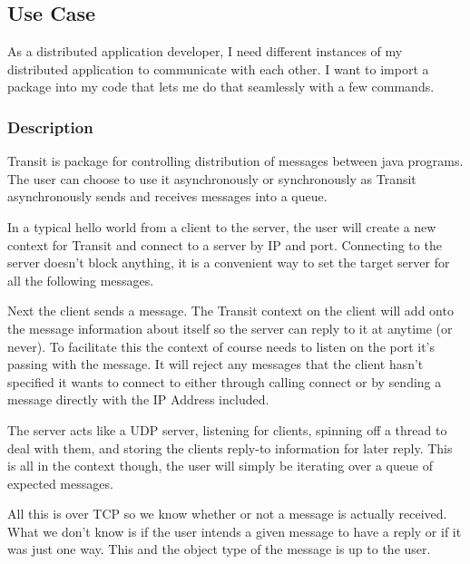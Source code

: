 \documentclass[10pt,journal,compsoc]{IEEEtran}
\begin{document}

 

\subsection{Use Case}
As a distributed application developer, I need different instances of my distributed application to communicate with each other. I want to import a package into my code that lets me do that seamlessly with a few commands.


\subsubsection{Description}
Transit is package for controlling distribution of messages between java programs. The user can choose to use it asynchronously or synchronously as Transit asynchronously sends and receives messages into a queue.

In a typical hello world from a client to the server, the user will create a new context for Transit and connect to a server by IP and port. Connecting to the server doesn't block anything, it is a convenient way to set the target server for all the following messages. 
 
Next the client sends a message. The Transit context on the client will add onto the message information about itself so the server can reply to it at anytime (or never). To facilitate this the context of course needs to listen on the port it's passing with the message. It will reject any messages that the client hasn't specified it wants to connect to either through calling connect or by sending a message directly with the IP Address included.

The server acts like a UDP server, listening for clients, spinning off a thread to deal with them, and storing the clients reply-to information for later reply. This is all in the context though, the user will simply be iterating over a queue of expected messages.

All this is over TCP so we know whether or not a message is actually received. What we don't know is if the user intends a given message to have a reply or if it was just one way. This and the object type of the message is up to the user.
\end{document}
